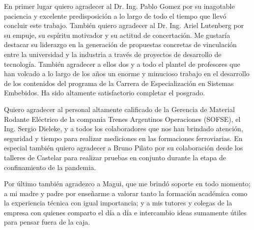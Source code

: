 \documentclass[
11pt, %
spanish,
singlespacing, %
parskip, %
headsepline, %
]{MastersDoctoralThesis} %
\begin{document}

\begin{acknowledgements}
\vspace{1.5cm}

En primer lugar quiero agradecer al Dr. Ing. Pablo Gomez por su inagotable paciencia y excelente predisposición a lo largo de todo el tiempo que llevó concluir este trabajo. También quiero agradecer al Dr. Ing. Ariel Lutenberg por su empuje, su espíritu motivador y su actitud de concertación. Me gustaría destacar su liderazgo en la generación de propuestas concretas de vinculación entre la universidad y la industria a través de proyectos de desarrollo de tecnología. También agradecer a ellos dos y a todo el plantel de profesores que han volcado a lo largo de los años un enorme y minucioso trabajo en el desarrollo de los contenidos del programa de la Carrera de Especialización en Sistemas Embebidos. Ha sido altamente satisfactorio completar el posgrado.

Quiero agradecer al personal altamente calificado de la Gerencia de Material Rodante Eléctrico de la companía Trenes Argentinos Operaciones (SOFSE), el Ing. Sergio Dieleke, y a todos los colaboradores que nos han brindado atención, seguridad y tiempo para realizar mediciones en las formaciones ferroviarias. En especial también quiero agradecer a Bruno Pilato por su colaboración desde los talleres de Castelar para realizar pruebas en conjunto durante la etapa de confinamiento de la pandemia. 

Por último también agradezco a Magui, que me brindó soporte en 
todo momento; a mi madre y padre por enseñarme a valorar tanto la formación académica como la experiencia técnica con igual importancia; y a mis tutores y colegas de la empresa con quienes comparto el día a día e intercambio ideas sumamente útiles para pensar fuera de la caja.


\end{acknowledgements}

\end{document}
